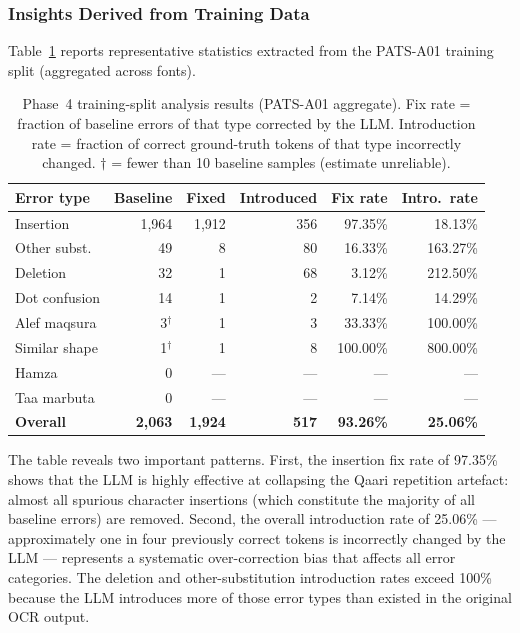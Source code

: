 \subsubsection{Insights Derived from Training Data}

Table~\ref{tab:phase4_insights} reports representative statistics extracted
from the PATS-A01 training split (aggregated across fonts).

\begin{table}[ht]
\caption{Phase~4 training-split analysis results (PATS-A01 aggregate).
         Fix rate = fraction of baseline errors of that type
         corrected by the LLM. Introduction rate = fraction of correct
         ground-truth tokens of that type incorrectly changed.
         $\dagger$ = fewer than 10 baseline samples (estimate unreliable).}
\label{tab:phase4_insights}
\centering
\renewcommand{\arraystretch}{1.3}
\begin{tabular}{lrrrrr}
\toprule
\textbf{Error type} & \textbf{Baseline} & \textbf{Fixed} & \textbf{Introduced}
  & \textbf{Fix rate} & \textbf{Intro.\ rate} \\
\midrule
Insertion       & 1,964 & 1,912 & 356  & 97.35\% & 18.13\% \\
Other subst.    &    49 &     8 &  80  & 16.33\% & 163.27\% \\
Deletion        &    32 &     1 &  68  &  3.12\% & 212.50\% \\
Dot confusion   &    14 &     1 &   2  &  7.14\% &  14.29\% \\
Alef maqsura    & 3$^\dagger$ & 1 & 3 & 33.33\% & 100.00\% \\
Similar shape   & 1$^\dagger$ & 1 & 8 & 100.00\% & 800.00\% \\
Hamza           &     0 &   --- & ---  &    ---  &    --- \\
Taa marbuta     &     0 &   --- & ---  &    ---  &    --- \\
\midrule
\textbf{Overall} & \textbf{2,063} & \textbf{1,924} & \textbf{517}
  & \textbf{93.26\%} & \textbf{25.06\%} \\
\bottomrule
\end{tabular}
\end{table}

The table reveals two important patterns. First, the insertion fix rate of
97.35\% shows that the LLM is highly effective at collapsing the Qaari
repetition artefact: almost all spurious character insertions (which
constitute the majority of all baseline errors) are removed. Second, the
overall introduction rate of 25.06\% --- approximately one in four previously
correct tokens is incorrectly changed by the LLM --- represents a systematic
over-correction bias that affects all error categories. The deletion and
other-substitution introduction rates exceed 100\% because the LLM introduces
more of those error types than existed in the original OCR output.

